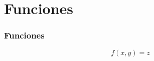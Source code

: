 \section{Funciones}

\begin{frame}
\frametitle{Funciones}

\begin{equation}
  f(x, y) = z 
\end{equation}

\end{frame}
